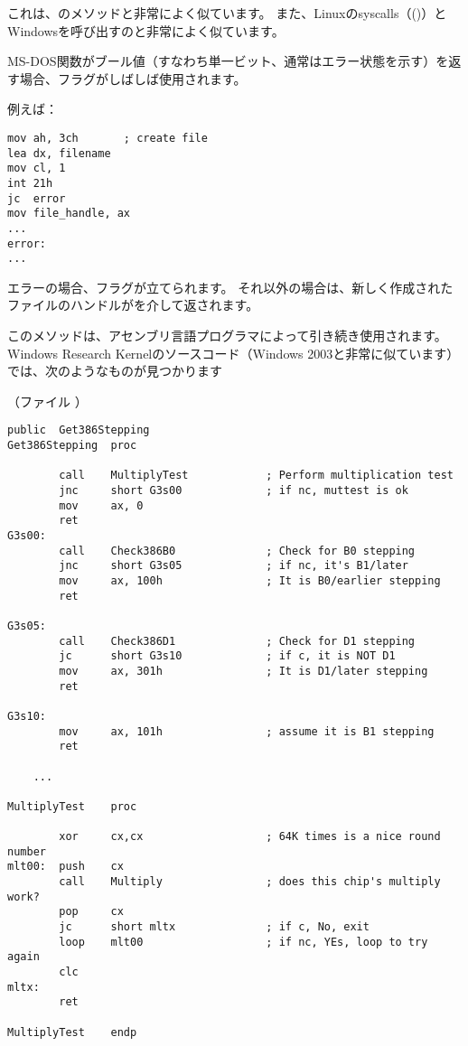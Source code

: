 これは、のメソッドと非常によく似ています。 
また、Linuxのsyscalls（()）とWindowsを呼び出すのと非常によく似ています。

MS-DOS関数がブール値（すなわち単一ビット、通常はエラー状態を示す）を返す場合、フラグがしばしば使用されます。

例えば：

\begin{lstlisting}[style=customasmx86]
mov ah, 3ch       ; create file
lea dx, filename
mov cl, 1
int 21h
jc  error
mov file_handle, ax
...
error:
...
\end{lstlisting}

エラーの場合、フラグが立てられます。 それ以外の場合は、新しく作成されたファイルのハンドルがを介して返されます。

このメソッドは、アセンブリ言語プログラマによって引き続き使用されます。 
Windows Research Kernelのソースコード（Windows 2003と非常に似ています）では、次のようなものが見つかります

（ファイル ）

\begin{lstlisting}[style=customasmx86]
        public  Get386Stepping
Get386Stepping  proc

        call    MultiplyTest            ; Perform multiplication test
        jnc     short G3s00             ; if nc, muttest is ok
        mov     ax, 0
        ret
G3s00:
        call    Check386B0              ; Check for B0 stepping
        jnc     short G3s05             ; if nc, it's B1/later
        mov     ax, 100h                ; It is B0/earlier stepping
        ret

G3s05:
        call    Check386D1              ; Check for D1 stepping
        jc      short G3s10             ; if c, it is NOT D1
        mov     ax, 301h                ; It is D1/later stepping
        ret

G3s10:
        mov     ax, 101h                ; assume it is B1 stepping
        ret

	...

MultiplyTest    proc

        xor     cx,cx                   ; 64K times is a nice round number
mlt00:  push    cx
        call    Multiply                ; does this chip's multiply work?
        pop     cx
        jc      short mltx              ; if c, No, exit
        loop    mlt00                   ; if nc, YEs, loop to try again
        clc
mltx:
        ret

MultiplyTest    endp
\end{lstlisting}

